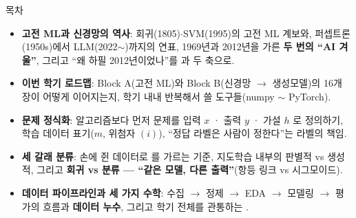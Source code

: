 \renewcommand{\ksacredit}{}

\begin{frame}{목차}
  \small
  \begin{itemize}
    \item \textbf{고전 ML과 신경망의 역사}: 회귀(1805)$\cdot$SVM(1995)의
      고전 ML 계보와, 퍼셉트론(1950s)에서 LLM(2022$\sim$)까지의
      연표, 1969년과 2012년을 가른 \textbf{두 번의 ``AI 겨울''}, 그리고
      ``왜 하필 2012년이었나''를 과  두 축으로.
    \item \textbf{이번 학기 로드맵}: Block A(고전 ML)와 Block B(신경망 $\to$
      생성모델)의 16개 장이 어떻게 이어지는지, 학기 내내 반복해서 쓸 도구들(numpy $\sim$ PyTorch).
    \item \textbf{문제 정식화}: 알고리즘보다 먼저 문제를 입력 $x$ ·
      출력 $y$ · 가설 $h$ 로 정의하기, 학습 데이터 표기($m$, 위첨자 $(i)$),
      ``정답 라벨은 사람이 정한다''는 라벨의 책임.
    \item \textbf{세 갈래 분류}: 손에 쥔 데이터로 를
      가르는 기준, 지도학습 내부의 판별적 vs 생성적, 그리고
      \textbf{회귀 vs 분류 --- ``같은 모델, 다른 출력''}(항등 링크 vs
      시그모이드).
    \item \textbf{데이터 파이프라인과 세 가지 수학}: 수집 $\to$ 정제 $\to$
      EDA $\to$ 모델링 $\to$ 평가의 흐름과 \textbf{데이터 누수}, 그리고 학기
      전체를 관통하는 .
  \end{itemize}
\end{frame}
